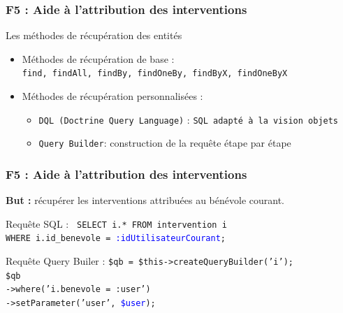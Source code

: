 \begin{frame}
\frametitle{F5 : Aide à l'attribution des interventions}
	\begin{block}{Les méthodes de récupération des entités}
		\begin{itemize}
			\item Méthodes de récupération de base : \\
			 \texttt{find, findAll, findBy, findOneBy, findByX, findOneByX}
			\item Méthodes de récupération personnalisées : \\
			\begin{itemize}
			\item \texttt{DQL (Doctrine Query Language)} : \texttt{SQL adapté à la vision objets}
			\item \texttt{Query Builder}: construction de la requête étape par étape
			\end{itemize}			
		\end{itemize}
	  \end{block}
\end{frame}

\begin{frame}
\frametitle{F5 : Aide à l'attribution des interventions}
	\textbf{But :} récupérer les interventions attribuées au bénévole courant. \\
	\vskip 0.5cm
	\begin{block}{Requête SQL :}	
	\texttt{ 
	SELECT i.* FROM intervention i \\
	\setlength{\parindent}{1cm}	WHERE i.id\_benevole = \textcolor{blue}{:idUtilisateurCourant};}
	\end{block}
	\begin{block}{Requête Query Builer :}
	\noindent \texttt{\$qb = \$this->createQueryBuilder('i'); \\
	\noindent \$qb \\
	\setlength{\parindent}{1cm} ->where('i.benevole = :user') \\
    \setlength{\parindent}{1cm} ->setParameter('user', \textcolor{blue}{\$user});}
	\end{block}
\end{frame}

